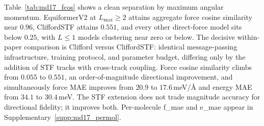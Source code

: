 Table~\ref{tab:md17_fcos} shows a clean separation by maximum angular momentum. EquiformerV2 at $L_{\max}\!\geq\!2$ attains aggregate force cosine similarity near $0.96$, CliffordSTF attains $0.551$, and every other direct-force model sits below $0.25$, with $L\!\leq\!1$ models clustering near zero or below. The decisive within-paper comparison is Clifford versus CliffordSTF: identical message-passing infrastructure, training protocol, and parameter budget, differing only by the addition of STF tracks with cross-track coupling. Force cosine similarity climbs from $0.055$ to $0.551$, an order-of-magnitude directional improvement, and simultaneously force MAE improves from $20.9$ to $17.6$\,meV/\AA{} and energy MAE from $34.1$ to $30.4$\,meV. The STF extension does not trade magnitude accuracy for directional fidelity; it improves both. Per-molecule f\_mae and e\_mae appear in Supplementary~\ref{supp:md17_permol}.

